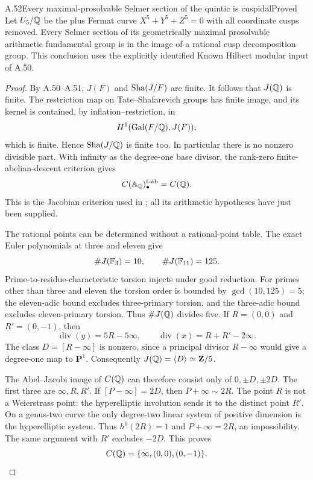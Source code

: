 \begin{statement}{A.52}{Every maximal-prosolvable Selmer section of the quintic is cuspidal}{Proved}
Let $U_5/\mathbb Q$ be the plus Fermat curve
$X^5+Y^5+Z^5=0$ with all coordinate cusps removed. Every Selmer section
of its geometrically maximal prosolvable arithmetic fundamental group
is in the image of a rational cusp decomposition group. This conclusion
uses the explicitly identified Known Hilbert modular input of A.50.
\end{statement}
\begin{proof}
By A.50--A.51, $J(F)$ and $\mathop{\mathrm{Sha}}(J/F)$ are finite. It follows that
$J(\mathbb Q)$ is finite. The restriction map on Tate--Shafarevich groups has
finite image, and its kernel is contained, by inflation--restriction, in
\[
 H^1(\operatorname{Gal}(F/\mathbb Q),J(F)),
\]
which is finite. Hence $\mathop{\mathrm{Sha}}(J/\mathbb Q)$ is finite too. In particular
there is no nonzero divisible part. With infinity as the degree-one
base divisor, the rank-zero finite-abelian-descent criterion gives
\[
 C(\mathbb A_\mathbb Q)_\bullet^{\mathrm{f\text{-}ab}}=C(\mathbb Q).
\]
This is the Jacobian criterion used in
\citet[section~6]{AMStoll2007}; all its arithmetic hypotheses have just
been supplied.

The rational points can be determined without a rational-point table.
The exact Euler polynomials at three and eleven give
\[
 \#J(\mathbb F_3)=10,\qquad \#J(\mathbb F_{11})=125.
\]
Prime-to-residue-characteristic torsion injects under good reduction.
For primes other than three and eleven the torsion order is bounded
by $\gcd(10,125)=5$; the eleven-adic bound excludes three-primary
torsion, and the three-adic bound excludes eleven-primary torsion.
Thus $\#J(\mathbb Q)$ divides five. If $R=(0,0)$ and $R'=(0,-1)$, then
\[
 \operatorname{div}(y)=5R-5\infty,\qquad
 \operatorname{div}(x)=R+R'-2\infty.
\]
The class $D=[R-\infty]$ is nonzero, since a principal divisor
$R-\infty$ would give a degree-one map to $\mathbf P^1$.
Consequently $J(\mathbb Q)=\langle D\rangle\simeq\mathbf Z/5$.

The Abel--Jacobi image of $C(\mathbb Q)$ can therefore consist only of
$0,\pm D,\pm2D$. The first three are $\infty,R,R'$. If
$[P-\infty]=2D$, then $P+\infty\sim2R$. The point $R$ is not a
Weierstrass point: the hyperelliptic involution sends it to the distinct
point $R'$. On a genus-two curve the only degree-two linear system of
positive dimension is the hyperelliptic system. Thus $h^0(2R)=1$ and
$P+\infty=2R$, an impossibility. The same argument with $R'$ excludes
$-2D$. This proves
\[
 C(\mathbb Q)=\{\infty,(0,0),(0,-1)\}.
\]


\end{proof}
